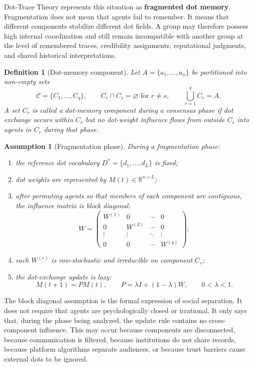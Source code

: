 \documentclass[11pt]{article}
\newtheorem{definition}{Definition}
\newtheorem{assumption}{Assumption}
\theoremstyle{remark}
\begin{document}
Dot-Trace Theory represents this situation as \textbf{fragmented dot
memory}. Fragmentation does not mean that agents fail to remember. It
means that different components stabilize different dot fields. A group
may therefore possess high internal coordination and still remain
incompatible with another group at the level of remembered traces,
credibility assignments, reputational judgments, and shared historical
interpretations.

\begin{definition}[Dot-memory component]
Let $A=\{a_1,\ldots,a_n\}$ be partitioned into non-empty sets
$$
\mathcal{C}=\{C_1,\ldots,C_q\}, \qquad C_r\cap C_s=\varnothing
\text{ for } r\neq s, \qquad \bigcup_{r=1}^q C_r=A.
$$
A set $C_r$ is called a dot-memory component during a consensus phase if
dot exchange occurs within $C_r$ but no dot-weight influence flows from
outside $C_r$ into agents in $C_r$ during that phase.
\end{definition}

\begin{assumption}[Fragmentation phase]\label{ass:fragmentation-phase}
During a fragmentation phase:
\begin{enumerate}[label=(\roman*)]
\item the reference dot vocabulary $D^*=\{d_1,\ldots,d_L\}$ is fixed;
\item dot weights are represented by $M(t)\in\mathbb{R}^{n\times L}$;
\item after permuting agents so that members of each component are
contiguous, the influence matrix is block diagonal:
$$
W=
\begin{pmatrix}
W^{(1)} & 0 & \cdots & 0\\
0 & W^{(2)} & \cdots & 0\\
\vdots & \vdots & \ddots & \vdots\\
0 & 0 & \cdots & W^{(q)}
\end{pmatrix};
$$
\item each $W^{(r)}$ is row-stochastic and irreducible on component
$C_r$;
\item the dot-exchange update is lazy:
$$
M(t+1)=PM(t), \qquad P=\lambda I+(1-\lambda)W, \qquad 0<\lambda<1.
$$
\end{enumerate}
\end{assumption}

The block diagonal assumption is the formal expression of social
separation. It does not require that agents are psychologically closed
or irrational. It only says that, during the phase being analyzed, the
update rule contains no cross-component influence. This may occur
because components are disconnected, because communication is filtered,
because institutions do not share records, because platform algorithms
separate audiences, or because trust barriers cause external dots to be
ignored.
\end{document}
